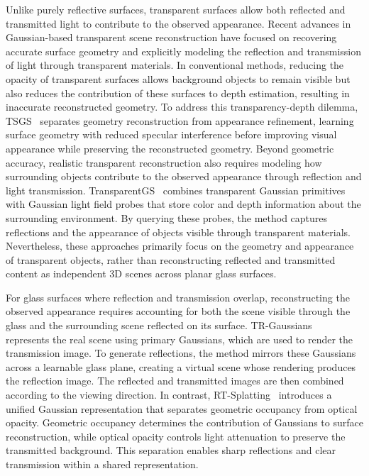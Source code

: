 Unlike purely reflective surfaces, transparent surfaces allow both reflected and transmitted light to contribute to the observed appearance. Recent advances in Gaussian-based transparent scene reconstruction have focused on recovering accurate surface geometry and explicitly modeling the reflection and transmission of light through transparent materials. In conventional methods, reducing the opacity of transparent surfaces allows background objects to remain visible but also reduces the contribution of these surfaces to depth estimation, resulting in inaccurate reconstructed geometry. To address this transparency-depth dilemma, TSGS~\cite{li2025} separates geometry reconstruction from appearance refinement, learning surface geometry with reduced specular interference before improving visual appearance while preserving the reconstructed geometry. Beyond geometric accuracy, realistic transparent reconstruction also requires modeling how surrounding objects contribute to the observed appearance through reflection and light transmission. TransparentGS~\cite{huang2025} combines transparent Gaussian primitives with Gaussian light field probes that store color and depth information about the surrounding environment. By querying these probes, the method captures reflections and the appearance of objects visible through transparent materials. Nevertheless, these approaches primarily focus on the geometry and appearance of transparent objects, rather than reconstructing reflected and transmitted content as independent 3D scenes across planar glass surfaces.

For glass surfaces where reflection and transmission overlap, reconstructing the observed appearance requires accounting for both the scene visible through the glass and the surrounding scene reflected on its surface. TR-Gaussians~\cite{liu2025} represents the real scene using primary Gaussians, which are used to render the transmission image. To generate reflections, the method mirrors these Gaussians across a learnable glass plane, creating a virtual scene whose rendering produces the reflection image. The reflected and transmitted images are then combined according to the viewing direction. In contrast, RT-Splatting~\cite{shi2026} introduces a unified Gaussian representation that separates geometric occupancy from optical opacity. Geometric occupancy determines the contribution of Gaussians to surface reconstruction, while optical opacity controls light attenuation to preserve the transmitted background. This separation enables sharp reflections and clear transmission within a shared representation.

